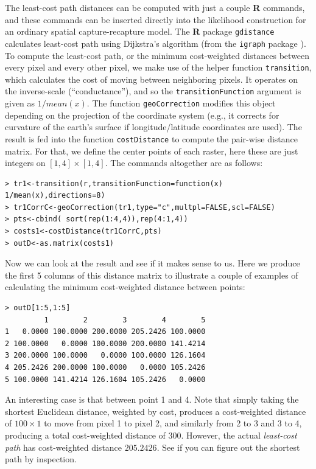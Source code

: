The least-cost path distances can be
computed with just a couple {\bf R} commands, and these commands can
be inserted directly into the likelihood construction for an ordinary
spatial capture-recapture model. The {\bf R} package
\mbox{\tt gdistance} calculates least-cost path using  Dijkstra's algorithm
\citep{dijkstra:1959} (from the \mbox{\tt igraph} package
\citep{csardi:2010}).
To compute the least-cost path, or the minimum cost-weighted distances
between every pixel and every other pixel, we make use of the helper
function \mbox{\tt transition}, which calculates the cost of moving
between neighboring pixels.  It operates on the inverse-scale
(``conductance''), and so the \mbox{\tt transitionFunction} argument
is given as $1/mean(x)$.  The function \mbox{\tt geoCorrection}
modifies this object depending on the projection of the coordinate
system (e.g., it corrects for curvature of the earth's surface if
longitude/latitude coordinates are used).  The result is fed into the
function \mbox{\tt costDistance} to compute the pair-wise distance
matrix. For that, we define the center points of each raster, here
these are just integers on $[1,4] \times [1,4]$.  The commands
altogether are as follows: {\small
\begin{verbatim}
> tr1<-transition(r,transitionFunction=function(x) 1/mean(x),directions=8)
> tr1CorrC<-geoCorrection(tr1,type="c",multpl=FALSE,scl=FALSE)
> pts<-cbind( sort(rep(1:4,4)),rep(4:1,4))
> costs1<-costDistance(tr1CorrC,pts)
> outD<-as.matrix(costs1)
\end{verbatim}
}
Now we can look at the result and see if it makes sense to us. Here we
produce the first 5 columns of this distance matrix to illustrate a
couple of examples of calculating the minimum cost-weighted distance
between points:
\begin{center}
{\small
\begin{verbatim}
> outD[1:5,1:5]
         1        2        3        4        5
1   0.0000 100.0000 200.0000 205.2426 100.0000
2 100.0000   0.0000 100.0000 200.0000 141.4214
3 200.0000 100.0000   0.0000 100.0000 126.1604
4 205.2426 200.0000 100.0000   0.0000 105.2426
5 100.0000 141.4214 126.1604 105.2426   0.0000
\end{verbatim}
}
\end{center}
An interesting case is that between point 1 and 4. Note that simply
taking the shortest Euclidean distance, weighted by cost, produces a
cost-weighted distance of $100 \times 1$ to move from pixel 1 to pixel
2, and similarly from 2 to 3 and 3 to 4, producing a total
cost-weighted distance of $300$. However, the actual {\it least-cost
  path} has cost-weighted distance $205.2426$. See if you can figure
out the shortest path by inspection.

